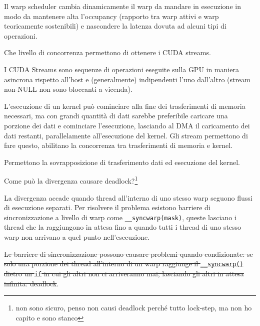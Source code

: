 \begin{questions}
\begin{solution}
        Il warp scheduler cambia dinamicamente il warp da mandare in esecuzione in modo da mantenere alta l'occupancy (rapporto tra warp attivi e warp teoricamente sostenibili) e nascondere la latenza dovuta ad alcuni tipi di operazioni.
    \end{solution}
    
    \question Che livello di concorrenza permettono di ottenere i CUDA streams.
    
    \begin{solution}
        I CUDA Streams sono sequenze di operazioni eseguite sulla GPU in maniera asincrona rispetto all'host e (generalmente) indipendenti l'uno dall'altro (stream non-NULL non sono bloccanti a vicenda).
        
        L'esecuzione di un kernel può cominciare alla fine dei trasferimenti di memoria necessari, ma con grandi quantità di dati sarebbe preferibile caricare una porzione dei dati e cominciare l'esecuzione, lasciando al DMA il caricamento dei dati restanti, parallelamente all'esecuzione del kernel. Gli stream permettono di fare questo, abilitano la concorrenza tra trasferimenti di memoria e kernel.
        
        Permettono la sovrapposizione di trasferimento dati ed esecuzione del kernel.
    \end{solution}
    
    \question Come può la divergenza causare deadlock?\footnote{non sono sicuro, penso non causi deadlock perché tutto lock-step, ma non ho capito e sono stanco}
    
    \begin{solution}
        La divergenza accade quando thread all'interno di uno stesso warp seguono flussi di esecuzione separati. Per risolvere il problema esistono barriere di sincronizzazione a livello di warp come \texttt{\_\_syncwarp(mask)}, queste lasciano i thread che la raggiungono in attesa fino a quando tutti i thread di uno stesso warp non arrivano a quel punto nell'esecuzione.
        
        \st{Le barriere di sincronizzazione possono causare problemi quando condizionate: se solo una porzione dei thread all'interno di un warp raggiunge il \texttt{\_\_syncwarp()} dietro un \texttt{if} in cui gli altri non ci arriveranno mai, lasciando gli altri in attesa infinita: deadlock}.
    \end{solution}
    
\end{questions}